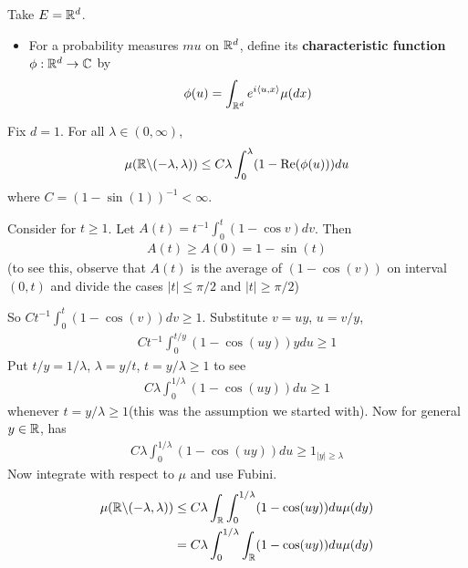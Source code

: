 \documentclass[10pt,a4paper]{report}
\newenvironment{proof}
{\begin{changemargin}{1cm}{0.5cm} 
	}%
	{\end{changemargin}
}
\begin{document}
Take $E = \mathbb{R}^d$. 
\begin{itemize}
\item For a probability measures $mu$ on $\mathbb{R}^d$, define its \textbf{characteristic function} $\phi : \mathbb{R}^d \rightarrow \mathbb{C}$ by
\begin{align*}
\phi(u) = \int_{\mathbb{R}^d} e^{i \langle u, x\rangle} \mu(dx)
\end{align*}
\end{itemize}
\s

 Fix $d=1$. For all $\lambda \in (0,\infty)$,
\begin{align*}
\mu(\mathbb{R} \backslash (-\lambda, \lambda)) \leq C\lambda \int_{0}^{\lambda} (1- \text{Re}(\phi(u))) du
\end{align*}
where $C = (1- \sin(1))^{-1} < \infty$.
\begin{proof}
\pf Consider for $t\geq 1$. Let $A(t) = t^{-1} \int_0^t (1-\cos v) dv$. Then
\begin{align*}
A(t) \geq A(0) = 1-\sin (t) 
\end{align*}
(to see this, observe that $A(t)$ is the average of $(1-\cos(v))$ on interval $(0,t)$ and divide the cases $|t| \leq \pi /2$ and $|t| \geq \pi/2$)

So $Ct^{-1} \int_0^t (1- \cos(v)) dv \geq 1$. Substitute $v = uy$, $u=v/y$,
\begin{align*}
Ct^{-1} \int_0^{t/y} (1- \cos(uy)) y du \geq 1
\end{align*}
Put $t/y = 1/\lambda$, $\lambda = y/t$, $t= y/\lambda \geq 1$ to see
\begin{align*}
C\lambda \int_{0}^{1/\lambda} (1- \cos (uy)) du \geq 1
\end{align*}
whenever $t=y/\lambda \geq 1$(this was the assumption we started with). Now for general $y \in \mathbb{R}$, has
\begin{align*}
C\lambda \int_{0}^{1/\lambda} (1- \cos (uy)) du \geq 1_{|y| \geq \lambda}
\end{align*}
Now integrate with respect to $\mu$ and use Fubini.
\begin{align*}
\mu(\mathbb{R} \backslash (-\lambda, \lambda)) &\leq C\lambda \int_{\mathbb{R}} \int_0^{1/\lambda} (1- \cos (uy)) du \mu(dy) \\
&= C\lambda \int_0^{1/\lambda} \int_{\mathbb{R}} (1- \cos(uy)) du \mu(dy)
\end{align*}

\eop
\end{proof}
\s

\newday
\end{document}
